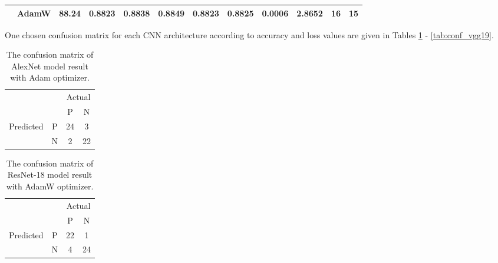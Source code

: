 \begin{landscape}
\begin{table}[!h]
\begin{tabular}{c|l|cccccc|cc|c|c}
                                    & AdamW                                                     & 88.24                  & 0.8823               & 0.8838               & 0.8849             & 0.8823    & 0.8825        & 0.0006                   & 2.8652             & 16                                                                                    & 15                                                                                     \\ \hline
\end{tabular}
\end{table}
\end{landscape}

One chosen confusion matrix for each CNN architecture according to accuracy and loss values are given in Tables \ref{tab:conf_alexnet} - \ref{tab:conf_vgg19}.

\begin{table}[!h]
\centering
\caption{The confusion matrix of AlexNet model result with Adam optimizer.}
\label{tab:conf_alexnet}
\begin{tabular}{cc|c|c|}
\cline{3-4}
                                                 &   & \multicolumn{2}{c|}{Actual} \\ \cline{3-4} 
                                                 &   & P            & N            \\ \hline
\multicolumn{1}{|c|}{\multirow{2}{*}{Predicted}} & P & 24           & 3            \\ \cline{2-4} 
\multicolumn{1}{|c|}{}                           & N & 2            & 22           \\ \hline
\end{tabular}
\end{table}

\begin{table}[!h]
\centering
\caption{The confusion matrix of ResNet-18 model result with AdamW optimizer.}
\label{tab:conf_resnet18}
\begin{tabular}{cc|c|c|}
\cline{3-4}
                                                 &   & \multicolumn{2}{c|}{Actual} \\ \cline{3-4} 
                                                 &   & P            & N            \\ \hline
\multicolumn{1}{|c|}{\multirow{2}{*}{Predicted}} & P & 22           & 1            \\ \cline{2-4} 
\multicolumn{1}{|c|}{}                           & N & 4            & 24           \\ \hline
\end{tabular}
\end{table}

